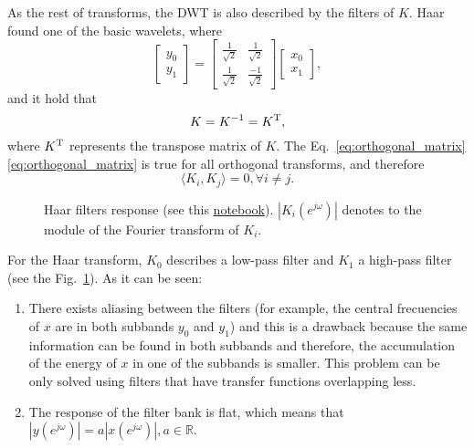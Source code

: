 As the rest of transforms, the DWT is also described by the filters of
$K$. Haar found one of the basic wavelets, where
\begin{equation}
  \begin{bmatrix}
    y_0 \\
    y_1
  \end{bmatrix}
  = 
  \begin{bmatrix} \frac{1}{\sqrt{2}} & \frac{1}{\sqrt{2}} \\ \frac{1}{\sqrt{2}} & \frac{-1}{\sqrt{2}} \end{bmatrix}
  \begin{bmatrix}
    x_0 \\
    x_1
  \end{bmatrix},
  \label{eq:Haar_transform}
\end{equation}
and it hold that
\begin{equation}
  K=K^{-1}=K^{\text T},
  \label{eq:orthogonal_matrix}
\end{equation}
where $K^{\text T}$ represents the transpose matrix of $K$. The
Eq.~\ref{eq:orthogonal_matrix} \ref{eq:orthogonal_matrix} is true for all orthogonal transforms,
and therefore
\begin{equation}
  \langle K_i, K_j\rangle = 0, \forall i\neq j.
\end{equation}

\begin{figure}
  \centering
  \caption{Haar filters response (see this
    \href{}{notebook}). $|K_i(e^{j\omega})|$ denotes to the
    module of the Fourier transform of $K_i$.}
  \label{fig:haar_filters_response}
\end{figure}

For the Haar transform, $K_0$ describes a low-pass filter and $K_1$ a
high-pass filter (see the Fig.~\ref{fig:haar_filters_response}). As it can be seen:
\begin{enumerate}
\item There exists aliasing between the filters (for example, the
  central frecuencies of $x$ are in both subbands $y_0$ and $y_1$) and
  this is a drawback because the same information can be found in both
  subbands and therefore, the accumulation of the energy of $x$ in one
  of the subbands is smaller. This problem can be only solved using
  filters that have transfer functions overlapping less.
\item The response of the filter bank is flat, which means that
  $|y(e^{j\omega})|=a|x(e^{j\omega})|, a\in\mathbb{R}$.
\end{enumerate}

